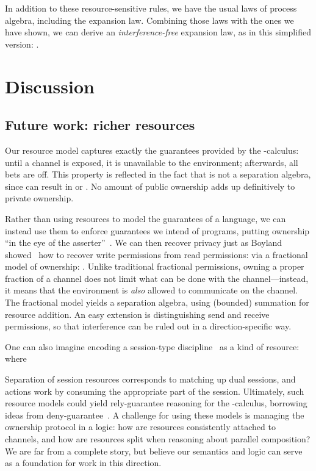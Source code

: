 \documentclass{entcs}
\begin{document}
In addition to these resource-sensitive rules, we have the usual laws
of process algebra, including the expansion law.  Combining those laws
with the ones we have shown, we can derive an \emph{interference-free}
expansion law, as in this simplified version:
.



\section{Discussion}

\subsection{Future work: richer resources}
\label{sec:resources}

Our resource model captures exactly the guarantees provided by the
-calculus: until a channel is exposed, it is unavailable to the
environment; afterwards, all bets are off.  This property is reflected
in the fact that  is not a separation algebra, since  can result in  or .  No amount of
public ownership adds up definitively to private ownership.

Rather than using resources to model the guarantees of a language, we
can instead use them to enforce guarantees we intend of programs, putting
ownership ``in the eye of the asserter''~\cite{O'Hearn2007}.  We can
then recover privacy just as Boyland showed~\cite{Boyland2003} how to
recover write permissions from read permissions: via a
fractional model of ownership: .  Unlike traditional fractional
permissions, owning a proper fraction of a channel does not limit what
can be done with the channel---instead, it means that the environment
is \emph{also} allowed to communicate on the channel.  The fractional
model yields a separation algebra, using (bounded) summation for
resource addition.  An easy extension is distinguishing send
and receive permissions, so that interference can be ruled out in a
direction-specific way.

One can also imagine encoding a session-type discipline~\cite{Honda1998} as a
kind of resource:  where

Separation of session resources corresponds to matching up dual
sessions, and actions work by consuming the appropriate part of the
session.  Ultimately, such resource models could yield rely-guarantee
reasoning for the -calculus, borrowing ideas from
deny-guarantee~\cite{Dodds2009}.  A challenge for using these models
is managing the ownership protocol in a logic: how are resources
consistently attached to channels, and how are resources split when
reasoning about parallel composition?  We are far from a complete
story, but believe our semantics and logic can serve as a foundation
for work in this direction.
\end{document}
